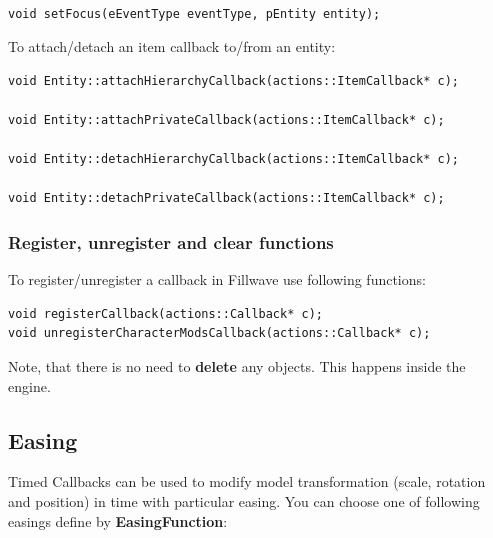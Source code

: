 \documentclass{article}
\begin{document}
\begin{lstlisting}

void setFocus(eEventType eventType, pEntity entity);

\end{lstlisting}
   
\indent \indent To attach/detach an item callback to/from an entity:

\begin{lstlisting}
void Entity::attachHierarchyCallback(actions::ItemCallback* c);

void Entity::attachPrivateCallback(actions::ItemCallback* c);

void Entity::detachHierarchyCallback(actions::ItemCallback* c);

void Entity::detachPrivateCallback(actions::ItemCallback* c);   \end{lstlisting}

\subsubsection{Register, unregister and clear functions}\label{sec:register functions}
\indent \indent To register/unregister a callback in Fillwave use following functions:

\begin{lstlisting}
void registerCallback(actions::Callback* c);
void unregisterCharacterModsCallback(actions::Callback* c);
\end{lstlisting}

\indent \indent Note, that there is no need to \textbf{delete} any objects. This happens inside the engine.

\newpage

\subsection{Easing}\label{sec:Easing}

\indent \indent Timed Callbacks can be used to modify model transformation (scale, rotation and position) in time with particular easing. You can choose one of following easings define by \textbf{EasingFunction}:
\end{document}
